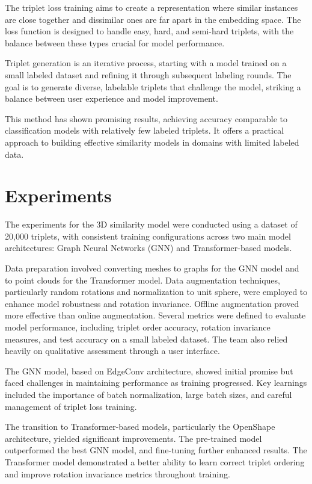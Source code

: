 \documentclass{article}
\begin{document}
The triplet loss training aims to create a representation where similar instances are close together and dissimilar ones are far apart in the embedding space. The loss function is designed to handle easy, hard, and semi-hard triplets, with the balance between these types crucial for model performance.

Triplet generation is an iterative process, starting with a model trained on a small labeled dataset and refining it through subsequent labeling rounds. The goal is to generate diverse, labelable triplets that challenge the model, striking a balance between user experience and model improvement.

This method has shown promising results, achieving accuracy comparable to classification models with relatively few labeled triplets. It offers a practical approach to building effective similarity models in domains with limited labeled data.


\section{Experiments}

The experiments for the 3D similarity model were conducted using a dataset of 20,000 triplets, with consistent training configurations across two main model architectures: Graph Neural Networks (GNN) and Transformer-based models.

Data preparation involved converting meshes to graphs for the GNN model and to point clouds for the Transformer model. Data augmentation techniques, particularly random rotations and normalization to unit sphere, were employed to enhance model robustness and rotation invariance. Offline augmentation proved more effective than online augmentation.
Several metrics were defined to evaluate model performance, including triplet order accuracy, rotation invariance measures, and test accuracy on a small labeled dataset. The team also relied heavily on qualitative assessment through a user interface.

The GNN model, based on EdgeConv architecture, showed initial promise but faced challenges in maintaining performance as training progressed. Key learnings included the importance of batch normalization, large batch sizes, and careful management of triplet loss training.

The transition to Transformer-based models, particularly the OpenShape architecture, yielded significant improvements. The pre-trained model outperformed the best GNN model, and fine-tuning further enhanced results. The Transformer model demonstrated a better ability to learn correct triplet ordering and improve rotation invariance metrics throughout training.
\end{document}
